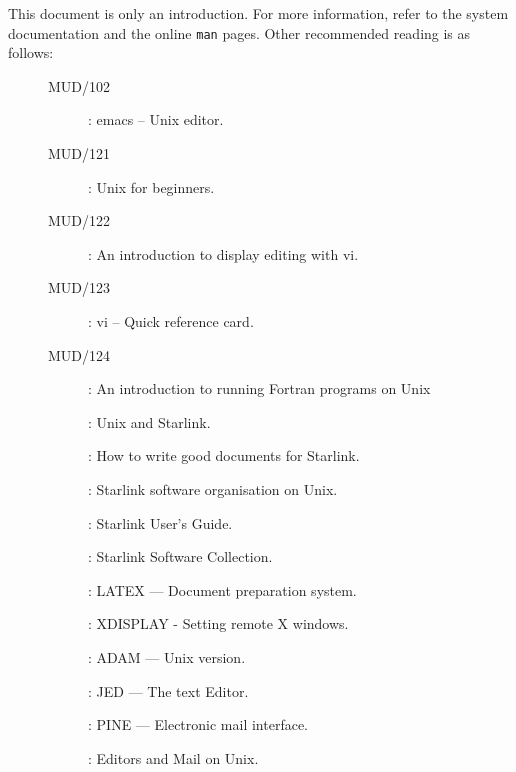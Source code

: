 This document is only an introduction.
For more information, refer to the system documentation and the online {\tt man}
pages.
Other recommended reading is as follows:

\begin{description}
\item[\mbox{}]\mbox{}
\begin{description}
\item [MUD/102]: emacs -- Unix editor.
\item [MUD/121]: Unix for beginners.
\item [MUD/122]: An introduction to display editing with vi.
\item [MUD/123]: vi -- Quick reference card.
\item [MUD/124]: An introduction to running Fortran programs on Unix
\item []: Unix and Starlink.
\item []: How to write good documents for Starlink.
\item []: Starlink software organisation on Unix.
\item []: Starlink User's Guide.
\item []: Starlink Software Collection.
\item []: LATEX --- Document preparation system.
\item []: XDISPLAY - Setting remote X windows.
\item []: ADAM --- Unix version.
\item []: JED --- The text Editor.
\item []: PINE --- Electronic mail interface.
\item []: Editors and Mail on Unix.
\end{description}

\end{description}


